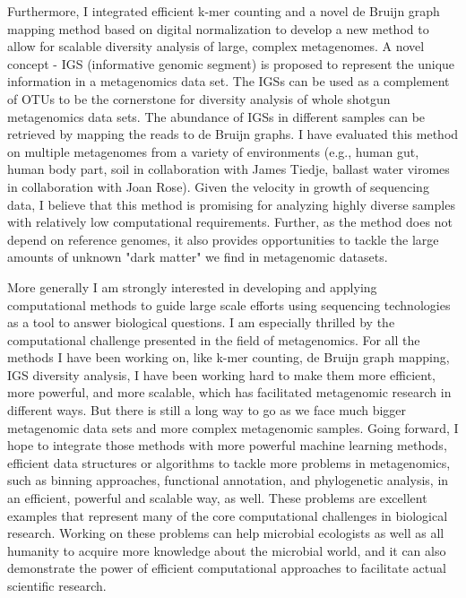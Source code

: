 \documentclass[12pt]{article}
\theoremstyle{plain} \numberwithin{equation}{section}
\theoremstyle{definition}
\begin{document}
Furthermore, I integrated efficient k-mer counting and a novel de Bruijn graph mapping method based on digital normalization 
to develop a new method to allow for scalable diversity analysis of large, complex metagenomes.  A novel concept - 
IGS (informative genomic segment) is proposed to represent the 
unique information in a metagenomics data set. The IGSs can be used as a complement of OTUs to be the cornerstone for 
diversity analysis of whole shotgun metagenomics data sets. The abundance of IGSs in different samples can be 
retrieved by mapping the reads to de Bruijn graphs. I have evaluated this method on multiple metagenomes from 
a variety of environments (e.g., human gut, human body part, soil in collaboration with James Tiedje, ballast water 
viromes in collaboration with Joan Rose). Given the velocity in growth of sequencing data, I believe that this method is 
promising for analyzing highly diverse samples with relatively low computational requirements. Further, as the method does not depend on 
reference genomes, it also provides opportunities to tackle the large amounts of unknown "dark matter" we 
find in metagenomic datasets.

More generally I am strongly interested in developing and applying computational methods to guide large scale efforts using 
sequencing technologies as a tool to answer biological questions. I am especially thrilled by the computational challenge 
presented in the field of metagenomics. For all the methods I have been working on, like k-mer counting, de Bruijn graph 
mapping, IGS diversity analysis, I have been working hard to make them more efficient, more powerful, and more scalable, 
which has facilitated metagenomic research in different ways. But there is still a long way to go as we face much bigger 
metagenomic data sets and more complex metagenomic samples.  Going forward, I hope to integrate those methods with more powerful machine learning methods,  efficient data structures or algorithms to tackle more 
 problems in metagenomics, such as binning approaches, functional annotation, and phylogenetic analysis,  in an efficient, 
  powerful and scalable way, as well.  These problems are excellent examples that represent many of the core computational 
 challenges in biological research. Working on these problems can help microbial ecologists as well as all humanity to acquire 
 more knowledge about the microbial world, and it can also demonstrate the power of efficient computational approaches to 
 facilitate actual scientific research. 

\raisebox{1cm}
\end{document}
